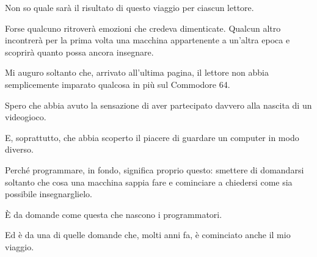 \documentclass{article}
\begin{document}
Non so quale sarà il risultato di questo viaggio per ciascun lettore.

Forse qualcuno ritroverà emozioni che credeva dimenticate. Qualcun altro incontrerà per la prima volta una macchina
appartenente a un'altra epoca e scoprirà quanto possa ancora insegnare.

Mi auguro soltanto che, arrivato all'ultima pagina, il lettore non abbia semplicemente imparato qualcosa in più sul
Commodore 64.

Spero che abbia avuto la sensazione di aver partecipato davvero alla nascita di un videogioco.

E, soprattutto, che abbia scoperto il piacere di guardare un computer in modo diverso.

Perché programmare, in fondo, significa proprio questo: smettere di domandarsi soltanto che cosa una macchina sappia
fare e cominciare a chiedersi come sia possibile insegnarglielo.

È da domande come questa che nascono i programmatori.

Ed è da una di quelle domande che, molti anni fa, è cominciato anche il mio viaggio.


\bigskip
\end{document}
